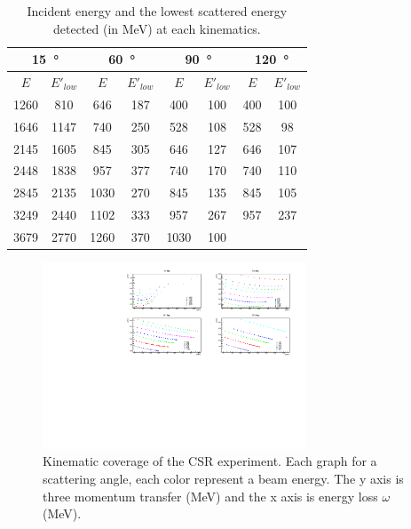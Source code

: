 \begin{table}[tb!]
\center
\begin{tabular}{|c|c|c|c|c|c|c|c|}
\hline
\multicolumn{2}{|c|}{\SI{15}{\degree}} & \multicolumn{2}{c|}{\SI{60}{\degree}} & \multicolumn{2}{c|}{\SI{90}{\degree}} & \multicolumn{2}{c|}{\SI{120}{\degree}} \\ \hline
$E$      & $E'_{low}$    & $E$     & $E'_{low}$    & $E$     & $E'_{low}$    & $E$     & $E'_{low}$     \\ \hline
1260     & 810           & 646     & 187           & 400     & 100           & 400     & 100            \\
1646     & 1147          & 740     & 250           & 528     & 108           & 528     & 98             \\
2145     & 1605          & 845     & 305           & 646     & 127           & 646     & 107            \\
2448     & 1838          & 957     & 377           & 740     & 170           & 740     & 110            \\
2845     & 2135          & 1030    & 270           & 845     & 135           & 845     & 105            \\
3249     & 2440          & 1102    & 333           & 957     & 267           & 957     & 237            \\
3679     & 2770          & 1260    & 370           & 1030    & 100           &         &                \\ \hline
\end{tabular}
\caption[E E' talbe]{Incident energy and the lowest scattered energy detected (in MeV) at each kinematics.} \label{tab:E_E'_table}
\end{table}

\begin{figure}[h]
\centering
\includegraphics[width=0.7\textwidth]{figs/He4kinematics.pdf}
\caption[He4 kinematic]{Kinematic coverage of the CSR experiment. Each graph for a scattering angle, each color represent a beam energy.
The y axis is three momentum transfer (MeV) and the x axis is energy loss $\omega$ (MeV).
\label{fig:kinematic_coverage}}
\end{figure}

